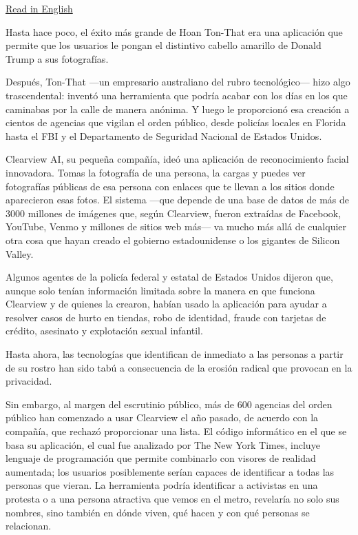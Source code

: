 \href{https://www.nytimes.com/2020/01/18/technology/clearview-privacy-facial-recognition.html}{Read
in English}

Hasta hace poco, el éxito más grande de Hoan Ton-That era una aplicación
que permite que los usuarios le pongan el distintivo cabello amarillo de
Donald Trump a sus fotografías.

Después, Ton-That ---un empresario australiano del rubro tecnológico---
hizo algo trascendental: inventó una herramienta que podría acabar con
los días en los que caminabas por la calle de manera anónima. Y luego le
proporcionó esa creación a cientos de agencias que vigilan el orden
público, desde policías locales en Florida hasta el FBI y el
Departamento de Seguridad Nacional de Estados Unidos.

Clearview AI, su pequeña compañía, ideó una aplicación de reconocimiento
facial innovadora. Tomas la fotografía de una persona, la cargas y
puedes ver fotografías públicas de esa persona con enlaces que te llevan
a los sitios donde aparecieron esas fotos. El sistema ---que depende de
una base de datos de más de 3000 millones de imágenes que, según
Clearview, fueron extraídas de Facebook, YouTube, Venmo y millones de
sitios web más--- va mucho más allá de cualquier otra cosa que hayan
creado el gobierno estadounidense o los gigantes de Silicon Valley.

Algunos agentes de la policía federal y estatal de Estados Unidos
dijeron que, aunque solo tenían información limitada sobre la manera en
que funciona Clearview y de quienes la crearon, habían usado la
aplicación para ayudar a resolver casos de hurto en tiendas, robo de
identidad, fraude con tarjetas de crédito, asesinato y explotación
sexual infantil.

Hasta ahora, las tecnologías que identifican de inmediato a las personas
a partir de su rostro han sido tabú a consecuencia de la erosión radical
que provocan en la privacidad.

Sin embargo, al margen del escrutinio público, más de 600 agencias del
orden público han comenzado a usar Clearview el año pasado, de acuerdo
con la compañía, que rechazó proporcionar una lista. El código
informático en el que se basa su aplicación, el cual fue analizado por
The New York Times, incluye lenguaje de programación que permite
combinarlo con visores de realidad aumentada; los usuarios posiblemente
serían capaces de identificar a todas las personas que vieran. La
herramienta podría identificar a activistas en una protesta o a una
persona atractiva que vemos en el metro, revelaría no solo sus nombres,
sino también en dónde viven, qué hacen y con qué personas se relacionan.

